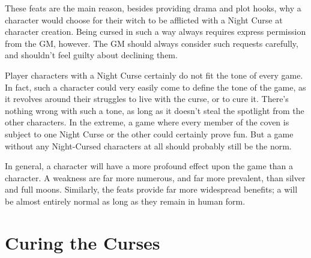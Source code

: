 These feats are the main reason, besides providing drama and plot hooks, why a character would choose for their witch to be afflicted with a Night Curse at character creation.
Being cursed in such a way always requires express permission from the GM, however.
The GM should always consider such requests carefully, and shouldn't feel guilty about declining them.

Player characters with a Night Curse certainly do not fit the tone of every game.
In fact, such a character could very easily come to define the tone of the game, as it revolves around their struggles to live with the curse, or to cure it.
There's nothing wrong with such a tone, as long as it doesn't steal the spotlight from the other characters.
In the extreme, a game where every member of the coven is subject to one Night Curse or the other could certainly prove fun.
But a game without any Night-Cursed characters at all should probably still be the norm.

In general, a {\vampire} character will have a more profound effect upon the game than a {\werewolf} character.
A {\vampirepossessive} weakness are far more numerous, and far more prevalent, than silver and full moons.
Similarly, the {\vampire} feats provide far more widespread benefits; a {\werewolf} will be almost entirely normal as long as they remain in human form.

\section{Curing the Curses}



